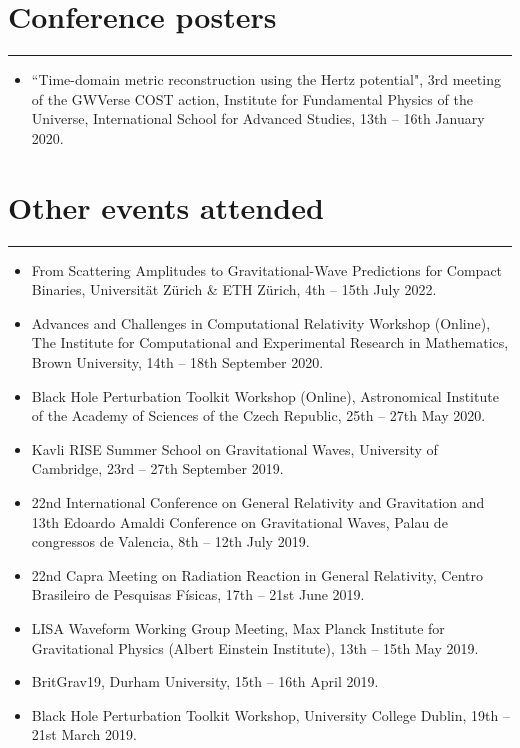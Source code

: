 \documentclass[10.5pt, oneside]{article}   	%
\begin{document}
{\color{Sectioncolour}
\section*{Conference posters}
\vspace{-3mm}
\noindent\rule{\linewidth}{0.6pt}}
\begin{itemize}
\item ``Time-domain metric reconstruction using the Hertz potential", 3rd meeting of the GWVerse COST action, Institute for Fundamental Physics of the Universe, International School for Advanced Studies, 13th -- 16th January 2020.
\end{itemize} 

 
{\color{Sectioncolour}
\section*{Other events attended}
\vspace{-3mm}
\noindent\rule{\linewidth}{0.6pt}}
\begin{itemize}
\item From Scattering Amplitudes to Gravitational-Wave Predictions for Compact Binaries, Universität Zürich \& ETH Zürich, 4th -- 15th July 2022.
\item Advances and Challenges in Computational Relativity Workshop (Online), The Institute for Computational and Experimental Research in Mathematics, Brown University, 14th -- 18th September 2020.
\item Black Hole Perturbation Toolkit Workshop (Online), Astronomical Institute of the Academy of Sciences of the Czech Republic, 25th -- 27th May 2020.
\item Kavli RISE Summer School on Gravitational Waves, University of Cambridge, 23rd -- 27th September 2019.
\item 22nd International Conference on General Relativity and Gravitation and 13th Edoardo Amaldi Conference on Gravitational Waves, Palau de congressos de Valencia, 8th -- 12th July 2019.
\item 22nd Capra Meeting on Radiation Reaction in General Relativity, Centro Brasileiro de Pesquisas Físicas, 17th -- 21st June 2019.
\item LISA Waveform Working Group Meeting, Max Planck Institute for Gravitational Physics (Albert Einstein Institute), 13th -- 15th May 2019.
\item BritGrav19, Durham University, 15th -- 16th April 2019.
\item Black Hole Perturbation Toolkit Workshop, University College Dublin, 19th -- 21st March 2019.
\end{itemize} 
\end{document}

